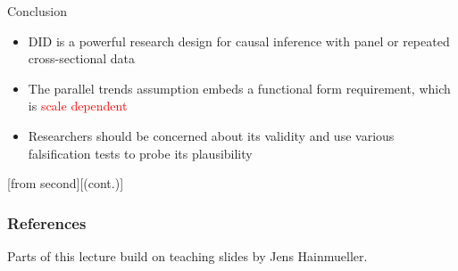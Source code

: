 \documentclass[xcolor=svgnames,9pt,english, aspectratio=169]{beamer}
\newcommand{\red}{\textcolor{red}}
\begin{document}






\begin{frame}[t]{Conclusion}
\begin{itemize}[<+->]\itemsep1em
\item DID is a powerful research design for causal inference with
panel or repeated cross-sectional data
\item The parallel trends assumption embeds a functional form requirement, which
is \red{scale dependent}
\item Researchers should be concerned about its validity and use various
falsification tests to probe its plausibility
\end{itemize}
\end{frame}


\appendix

[from second][(cont.)]
\begin{frame}[t,allowframebreaks=1.0]
  \frametitle{References}
  \vfill{\footnotesize\color{gray}Parts of this lecture build on teaching slides by Jens Hainmueller.}
\end{frame}
\end{document}
